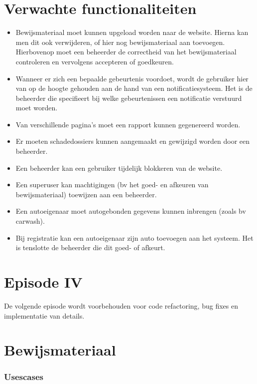 \documentclass[11pt,a4paper,oneside]{article}
\begin{document}
\part{Verwachte functionaliteiten}
\begin{itemize}
	\item	Bewijsmateriaal moet kunnen upgeload worden naar de website. Hierna kan men dit ook verwijderen, of hier nog bewijsmateriaal aan toevoegen.
		Hierbovenop moet een beheerder de correctheid van het bewijsmateriaal controleren en vervolgens accepteren of goedkeuren.
	\item   Wanneer er zich een bepaalde gebeurtenis voordoet, wordt de gebruiker hier van op de hoogte gehouden aan de hand van een notificatiesysteem. Het is de beheerder
		die specifieert bij welke gebeurtenissen een notificatie verstuurd moet worden.
	\item   Van verschillende pagina's moet een rapport kunnen gegenereerd worden.
	\item 	Er moeten schadedossiers kunnen aangemaakt en gewijzigd worden door een beheerder.
	\item   Een beheerder kan een gebruiker tijdelijk blokkeren van de website.
	\item	Een superuser kan machtigingen (bv het goed- en afkeuren van bewijsmateriaal) toewijzen aan een beheerder.
	\item	Een autoeigenaar moet autogebonden gegevens kunnen inbrengen (zoals bv carwash).
	\item	Bij registratie kan een autoeigenaar zijn auto toevoegen aan het systeem. Het is tenslotte de beheerder die dit goed- of afkeurt.
\end{itemize}

\setcounter{section}{0}
\setcounter{subsection}{0}
\part{Episode IV}
De volgende episode wordt voorbehouden voor code refactoring, bug fixes en implementatie van details.

\setcounter{section}{0}
\setcounter{subsection}{0}
\part{Bewijsmateriaal}
\section{Usescases}
\end{document}
